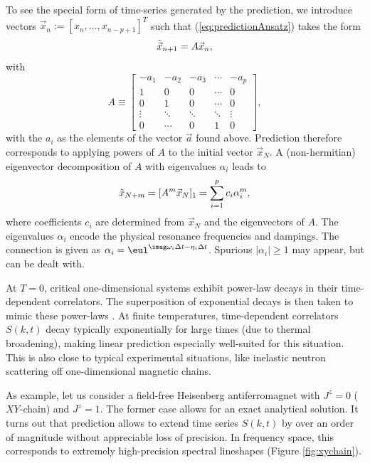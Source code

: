 To see the special form of time-series generated by the prediction, 
we introduce vectors $\vec{x}_n := [x_{n}, \ldots, x_{n-p+1}]^T$ such that (\ref{eq:predictionAnsatz}) takes the form
\begin{equation}
\tilde{\vec{x}}_{n+1} = A \* \vec{x}_n,	
\end{equation}
 with 
\begin{equation}\label{eq:predictionMatrix}
A\equiv
\left[
\begin{array}{ccccc}
 -a_1&-a_2&-a_3&\cdots&-a_p\\
  1  & 0  & 0  &\cdots& 0  \\
  0  & 1  & 0  &\cdots& 0  \\
\vdots&\ddots&\ddots&\ddots&\vdots\\
  0   &\cdots& 0  & 1  & 0
\end{array}  
\right] ,
\end{equation}
with the $a_i$ as the elements of the vector $\vec{a}$ found above.
Prediction therefore corresponds to applying powers of $A$ to the initial vector $\vec{x}_N$. A (non-hermitian) eigenvector decomposition of $A$ with eigenvalues $\alpha_i$ leads to 
\begin{equation}
\tilde x_{N+m} = [A^m \* \vec{x}_N]_1=\sum_{i=1}^p c_i \alpha_i^m,
\end{equation}
where coefficients $c_i$ are determined from $\vec{x}_N$ and the eigenvectors of $A$. The eigenvalues $\alpha_i$ encode the physical resonance frequencies and dampings. The connection is given as
$\alpha_i = \eul^{\imag  \omega_i \Delta t - \eta_i \Delta t}$.
Spurious $|\alpha_i|\geq 1$ may appear, but can be dealt with\cite{Barthel09b}.

At $T=0$, critical one-dimensional systems exhibit power-law decays in their time-dependent correlators. The superposition of exponential decays is then taken to mimic these power-laws \cite{Pereira08}. At finite temperatures, time-dependent correlators $S(k,t)$ decay typically exponentially for large times (due to thermal broadening), making linear prediction especially well-suited for this situation. This is also close to typical experimental situations, like inelastic neutron scattering off one-dimensional magnetic chains.

As example, let us consider a field-free Heisenberg antiferromagnet with $J^z=0$ ($XY$-chain) and $J^z=1$. The former case allows for an exact analytical solution. It turns out that prediction allows to extend time series $S(k,t)$ by over an order of magnitude without appreciable loss of precision. In frequency  space, this corresponds to extremely high-precision spectral lineshapes (Figure \ref{fig:xychain}). 

